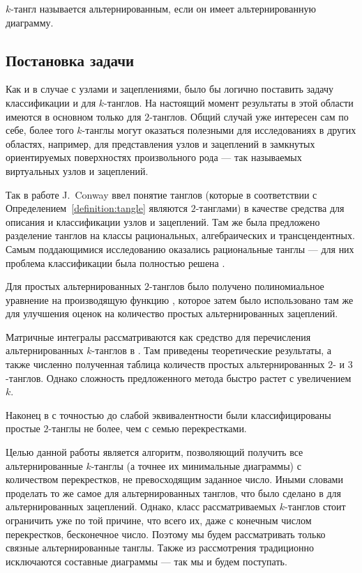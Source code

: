 	\begin{definition}
		$k$-тангл называется альтернированным, если он имеет альтернированную диаграмму.
	\end{definition}


	\subsection{Постановка задачи}

	Как и в случае с узлами и зацеплениями, было бы логично поставить задачу классификации и для $k$-танглов. На настоящий
	момент результаты в этой области имеются в основном только для $2$-танглов. Общий случай уже интересен сам по себе,
	более того $k$-танглы могут оказаться полезными для исследованиях в других областях, например, для представления узлов
	и зацеплений в замкнутых ориентируемых поверхностях произвольного рода \cite{Kauffman1999, Kuperberg2003} --- так называемых
	виртуальных узлов и зацеплений.

	Так в работе \cite{Conway1970} J.~Conway ввел понятие танглов (которые в соответствии с Определением~\ref{definition:tangle}
	являются $2$-танглами) в качестве средства для описания и классификации узлов и зацеплений. Там же была предложено разделение
	танглов на классы рациональных, алгебраических и трансцендентных. Самым поддающимися исследованию оказались рациональные
	танглы --- для них проблема классификации была полностью решена \cite{KauffmanLambropoulou2004}.

	Для простых альтернированных $2$-танглов было получено полиномиальное уравнение на производящую функцию
	\cite{SundbergThistlethwaite1998}, которое затем было использовано там же для улучшения оценок на количество простых
	альтернированных зацеплений.

	Матричные интегралы рассматриваются как средство для перечисления альтернированных $k$-танглов в
	\cite{Justin1999_1, Justin1999_2, JustinZuber2000, Justin2001, JacobsenJustin2002, JustinZuber2003}.
	Там приведены теоретические результаты,	а также численно полученная таблица количеств простых альтернированных 
	$2$- и $3$-танглов. Однако сложность предложенного метода быстро растет с увеличением $k$.

	Наконец в \cite{KanenobuSaitoSatoh2003} с точностью до слабой эквивалентности были классифицированы простые $2$-танглы
	не более, чем с семью перекрестками.

	Целью данной работы является алгоритм, позволяющий получить все альтернированные $k$-танглы (а точнее их минимальные диаграммы)
	с количеством перекрестков, не превосходящим заданное число. Иными словами проделать то же самое для альтернированных танглов,
	что было сделано в \cite{Rankin2002_1, Rankin2002_2, Rankin2002_3} для альтернированных зацеплений. Однако, класс рассматриваемых
	$k$-танглов стоит ограничить уже по той причине, что всего их, даже с конечным числом перекрестков, бесконечное число. Поэтому
	мы будем рассматривать только связные альтернированные танглы. Также из рассмотрения традиционно исключаются составные
	диаграммы --- так мы и будем поступать.

